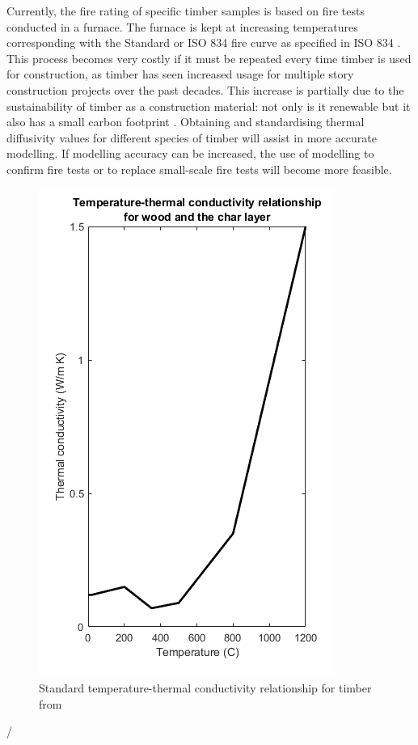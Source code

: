 Currently, the fire rating of specific timber samples is based on fire tests conducted in a furnace. 
The furnace is kept at increasing temperatures corresponding with the Standard or ISO 834 fire curve as specified in ISO 834 \citet{ISO:1999}.
This process becomes very costly if it must be repeated every time timber is used for construction, as timber has seen increased usage for multiple story construction projects over the past decades. 
This increase is partially due to the sustainability of timber as a construction material: not only is it renewable but it also has a small carbon footprint \citep{Salvadori:2017}.
Obtaining and standardising thermal diffusivity values for different species of timber will assist in more accurate modelling.
If modelling accuracy can be increased, the use of modelling to confirm fire tests or to replace small-scale fire tests will become more feasible.


	\begin{figure}
	\label{kvalue_fig}
	\centering
	\includegraphics[width = 0.5\linewidth]{figures/kvalues_euro.png}
	\caption{Standard temperature-thermal conductivity relationship for timber from \citep{Euro:2004}}
	\end{figure}/


